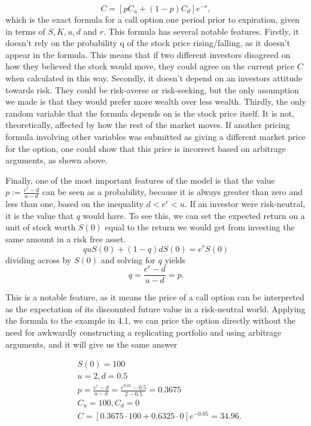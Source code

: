 \documentclass[letterpaper,12pt]{article}
\theoremstyle{plain}
\numberwithin{equation}{section}
\begin{document}
\begin{equation}
	C = [pC_u + (1-p)C_d]e^{-r},
\end{equation}
which is the exact formula for a call option one period prior to expiration, given in terms of $S, K, u, d$ and $r$. This formula has several notable features. Firstly, it doesn't rely on the probability q of the stock price rising/falling, as it doesn't appear in the formula. This means that if two different investors disagreed on how they believed the stock would move, they could agree on the current price $C$ when calculated in this way. Secondly, it doesn't depend on an investors attitude towards risk. They could be risk-averse or risk-seeking, but the only assumption we made is that they would prefer more wealth over less wealth. Thirdly, the only random variable that the formula depends on is the stock price itself. It is not, theoretically, affected by how the rest of the market moves. If another pricing formula involving other variables was submitted as giving a different market price for the option, one could show that this price is incorrect based on arbitrage arguments, as shown above.

Finally, one of the most important features of the model is that the value $p := \frac{e^r-d}{u-d}$ can be seen as a probability, because it is always greater than zero and less than one, based on the inequality $d < e^r < u$. If an investor were risk-neutral, it is the value that $q$ would have. To see this, we can set the expected return on a unit of stock worth $S(0)$ equal to the return we would get from investing the same amount in a risk free asset.
\begin{equation*}
	quS(0) + (1-q)dS(0) = e^{r}S(0)
\end{equation*}
dividing across by $S(0)$ and solving for $q$ yields
\begin{equation*}
	q = \frac{e^r-d}{u-d} = p.
\end{equation*}


This is a notable feature, as it means the price of a call option can be interpreted as the expectation of its discounted future value in a risk-neutral world. Applying the formula to the example in 4.1, we can price the option directly without the need for awkwardly constructing a replicating portfolio and using arbitrage arguments, and it will give us the same answer

\begin{equation*}
\begin{aligned}
	& S(0)  = 100 \\
	& u = 2, d = 0.5 \\
	& p = \frac{e^r-d}{u-d} = \frac{e^{0.05}-0.5}{2-0.5} = 0.3675 \\
	& C_u = 100, C_d = 0 \\
	& C = [0.3675\cdot100 + 0.6325\cdot0]e^{-0.05} = 34.96.
\end{aligned}
\end{equation*}
\end{document}
